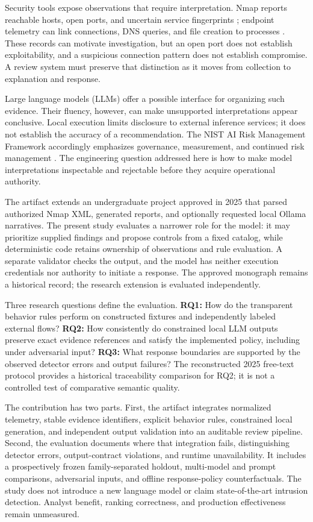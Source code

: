 \documentclass[11pt,a4paper,onecolumn]{IEEEtran}
\begin{document}
Security tools expose observations that require interpretation. Nmap reports reachable hosts, open ports, and uncertain service fingerprints \cite{lyon2009,nmapdocs2025}; endpoint telemetry can link connections, DNS queries, and file creation to processes \cite{sysmonevents2026}. These records can motivate investigation, but an open port does not establish exploitability, and a suspicious connection pattern does not establish compromise. A review system must preserve that distinction as it moves from collection to explanation and response.

Large language models (LLMs) offer a possible interface for organizing such evidence. Their fluency, however, can make unsupported interpretations appear conclusive. Local execution limits disclosure to external inference services; it does not establish the accuracy of a recommendation. The NIST AI Risk Management Framework accordingly emphasizes governance, measurement, and continued risk management \cite{nistai1001}. The engineering question addressed here is how to make model interpretations inspectable and rejectable before they acquire operational authority.

The artifact extends an undergraduate project approved in 2025 that parsed authorized Nmap XML, generated reports, and optionally requested local Ollama narratives. The present study evaluates a narrower role for the model: it may prioritize supplied findings and propose controls from a fixed catalog, while deterministic code retains ownership of observations and rule evaluation. A separate validator checks the output, and the model has neither execution credentials nor authority to initiate a response. The approved monograph remains a historical record; the research extension is evaluated independently.

Three research questions define the evaluation. \textbf{RQ1:} How do the transparent behavior rules perform on constructed fixtures and independently labeled external flows? \textbf{RQ2:} How consistently do constrained local LLM outputs preserve exact evidence references and satisfy the implemented policy, including under adversarial input? \textbf{RQ3:} What response boundaries are supported by the observed detector errors and output failures? The reconstructed 2025 free-text protocol provides a historical traceability comparison for RQ2; it is not a controlled test of comparative semantic quality.

The contribution has two parts. First, the artifact integrates normalized telemetry, stable evidence identifiers, explicit behavior rules, constrained local generation, and independent output validation into an auditable review pipeline. Second, the evaluation documents where that integration fails, distinguishing detector errors, output-contract violations, and runtime unavailability. It includes a prospectively frozen family-separated holdout, multi-model and prompt comparisons, adversarial inputs, and offline response-policy counterfactuals. The study does not introduce a new language model or claim state-of-the-art intrusion detection. Analyst benefit, ranking correctness, and production effectiveness remain unmeasured.
\end{document}

